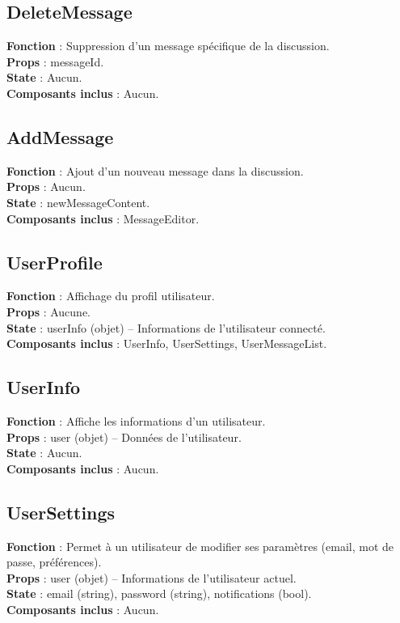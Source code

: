 \documentclass{article}
\begin{document}
\subsection*{DeleteMessage}
\textbf{Fonction} : Suppression d'un message spécifique de la discussion.\\
\textbf{Props} : messageId.\\
\textbf{State} : Aucun.\\
\textbf{Composants inclus} : Aucun.

\subsection*{AddMessage}
\textbf{Fonction} : Ajout d'un nouveau message dans la discussion.\\
\textbf{Props} : Aucun.\\
\textbf{State} : newMessageContent.\\
\textbf{Composants inclus} : MessageEditor.

\subsection*{UserProfile}
\textbf{Fonction} : Affichage du profil utilisateur.\\
\textbf{Props} : Aucune.\\
\textbf{State} : userInfo (objet) – Informations de l'utilisateur connecté.\\
\textbf{Composants inclus} : UserInfo, UserSettings, UserMessageList.

\subsection*{UserInfo}
\textbf{Fonction} : Affiche les informations d’un utilisateur.\\
\textbf{Props} : user (objet) – Données de l’utilisateur.\\
\textbf{State} : Aucun.\\
\textbf{Composants inclus} : Aucun.

\subsection*{UserSettings}
\textbf{Fonction} : Permet à un utilisateur de modifier ses paramètres (email, mot de passe, préférences).\\
\textbf{Props} : user (objet) – Informations de l’utilisateur actuel.\\
\textbf{State} : email (string), password (string), notifications (bool).\\
\textbf{Composants inclus} : Aucun.
\end{document}
